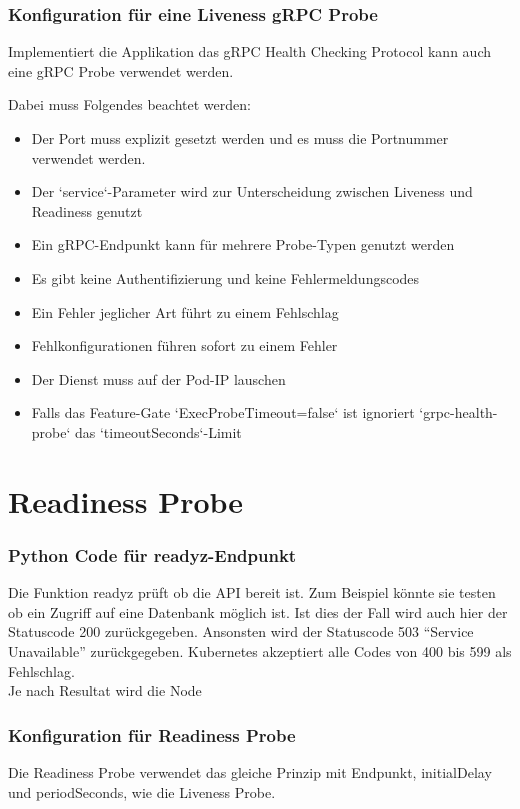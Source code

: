 \subsubsection{Konfiguration für eine Liveness gRPC Probe}
Implementiert die Applikation das gRPC Health Checking Protocol kann auch eine gRPC Probe verwendet werden.

Dabei muss Folgendes beachtet werden:
\begin{itemize}
    \item Der Port muss explizit gesetzt werden und es muss die Portnummer verwendet werden.
    \item Der `service`-Parameter wird zur Unterscheidung zwischen Liveness und Readiness genutzt
    \item Ein gRPC-Endpunkt kann für mehrere Probe-Typen genutzt werden
    \item Es gibt keine Authentifizierung und keine Fehlermeldungscodes
    \item Ein Fehler jeglicher Art führt zu einem Fehlschlag
    \item Fehlkonfigurationen führen sofort zu einem Fehler
    \item Der Dienst muss auf der Pod-IP lauschen
    \item Falls das Feature-Gate `ExecProbeTimeout=false` ist ignoriert `grpc-health-probe` das `timeoutSeconds`-Limit
\end{itemize}
\newpage
\section{Readiness Probe}
\subsubsection{Python Code für readyz-Endpunkt}
Die Funktion readyz prüft ob die API bereit ist. Zum Beispiel könnte sie testen ob ein Zugriff auf eine Datenbank möglich ist. Ist dies der Fall wird auch hier der Statuscode 200 zurückgegeben.
Ansonsten wird der Statuscode 503 \enquote{Service Unavailable} zurückgegeben. Kubernetes akzeptiert alle Codes von 400 bis 599 als Fehlschlag.\\
Je nach Resultat wird die Node

\subsubsection{Konfiguration für Readiness Probe}
Die Readiness Probe verwendet das gleiche Prinzip mit Endpunkt, initialDelay und periodSeconds, wie die Liveness Probe.

\newpage

